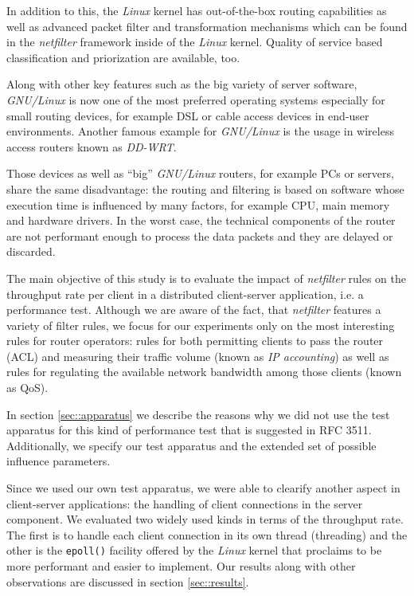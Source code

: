 \documentclass{sig-alternate}
\begin{document}
In addition to this, the \emph{Linux} kernel has out-of-the-box routing 
capabilities as well as advanced packet filter and transformation mechanisms 
which can be found in the \emph{netfilter} framework inside of the \emph{Linux} 
kernel. Quality of service based classification and priorization are available, 
too.

Along with other key features such as the big va\-rie\-ty of server software,
\emph{GNU/Linux} is now one of the most preferred operating systems especially 
for small rou\-ting devices, for example DSL or cable access devices in 
end-user environments. Another famous example for \emph{GNU/Linux} is the usage 
in wireless access routers known as \emph{DD-WRT}.

Those devices as well as ``big'' \emph{GNU/Linux} routers, for example PCs 
or servers, share the same disadvantage: the routing and filtering is based on 
software whose execution time is influenced by many factors, for example CPU, 
main memory and hardware drivers. In the worst case, the technical components 
of the router are not performant enough to process the data packets and they 
are delayed or discarded.

The main objective of this study is to evaluate the impact of \emph{netfilter} 
rules on the throughput rate per client in a distributed client-server 
application, i.e. a performance test. Although we are aware of the fact, that 
\emph{netfilter} features a variety of filter rules, we focus for our 
experiments only on the most interesting rules for router operators: rules for 
both permitting clients to pass the router (ACL) and measuring their traffic 
vo\-lu\-me (known as \emph{IP accoun\-ting}) as well as rules for regulating 
the available network bandwidth among those clients (known as QoS).

In section \ref{sec::apparatus} we describe the reasons why we did not use the 
test apparatus for this kind of performance test that is suggested in RFC 3511. 
Additionally, we spe\-ci\-fy our test apparatus and the extended set of 
possible influence parameters.

Since we used our own test apparatus, we were able to clea\-ri\-fy another 
aspect in client-server applications: the handling of client connections in the 
server component. We evaluated two widely used kinds in terms of the throughput 
rate. The first is to handle each client connection in its own thread 
(threading) and the other is the \texttt{epoll()} facility offered by the 
\emph{Linux} kernel that proclaims to be more performant and easier to 
implement. Our results along with other observations are discussed in section 
\ref{sec::results}.
\end{document}
